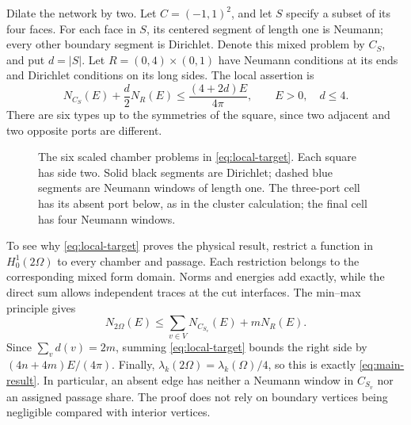 \documentclass[11pt,reqno]{amsart}
\numberwithin{equation}{section}
\newcommand{\abs}[1]{\lvert#1\rvert}
\newcommand{\Om}{\Omega}
\begin{document}
Dilate the network by two. Let $C=(-1,1)^2$, and let $S$
specify a subset of its four faces. For each face in $S$,
its centered segment of length one is Neumann; every other
boundary segment is Dirichlet. Denote this mixed problem by
$C_S$, and put $d=\abs S$. Let $R=(0,4)\times(0,1)$ have
Neumann conditions at its ends and Dirichlet conditions on
its long sides. The local assertion is
\begin{equation}\label{eq:local-target}
 N_{C_S}(E)+\frac d2N_R(E)
 \le\frac{(4+2d)E}{4\pi},\qquad E>0,\quad d\le4.
\end{equation}
There are six types up to the symmetries of the square,
since two adjacent and two opposite ports are different.

\begin{figure}[tb]
\centering
{}
\caption{The six scaled chamber problems in \eqref{eq:local-target}.
Each square has side two. Solid black segments are Dirichlet;
dashed blue segments are Neumann windows of length one.
The three-port cell has its absent port below, as in the
cluster calculation; the final cell has four Neumann windows.}
\label{fig:cells}
\end{figure}

To see why \eqref{eq:local-target} proves the physical result,
restrict a function in $H_0^1(2\Om)$ to every chamber and
passage. Each restriction belongs to the corresponding
mixed form domain. Norms and energies add exactly, while
the direct sum allows independent traces at the cut
interfaces. The min--max principle gives
\[
 N_{2\Om}(E)
 \le\sum_{v\in V}N_{C_{S_v}}(E)+mN_R(E).
\]
Since $\sum_v d(v)=2m$, summing \eqref{eq:local-target}
bounds the right side by $(4n+4m)E/(4\pi)$. Finally,
$\lambda_k(2\Om)=\lambda_k(\Om)/4$, so this is exactly
\eqref{eq:main-result}. In particular, an absent edge has
neither a Neumann window in $C_{S_v}$ nor an assigned
passage share. The proof does not rely on boundary vertices
being negligible compared with interior vertices.
\end{document}
